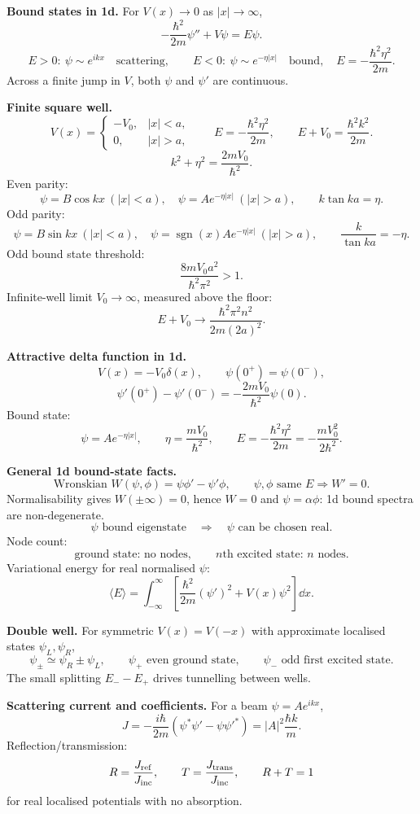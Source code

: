\noindent\textbf{Bound states in 1d.}
For \(V(x)\to0\) as \(|x|\to\infty\),
\[
-\frac{\hbar^2}{2m}\psi''+V\psi=E\psi.
\]
\[
E>0:\ \psi\sim e^{ikx}\quad\text{scattering},\qquad
E<0:\ \psi\sim e^{-\eta |x|}\quad\text{bound},\quad
E=-\frac{\hbar^2\eta^2}{2m}.
\]
Across a finite jump in \(V\), both \(\psi\) and \(\psi'\) are continuous.

\noindent\textbf{Finite square well.}
\[
V(x)=\begin{cases}-V_0,&|x|<a,\\0,&|x|>a,\end{cases}\qquad
E=-\frac{\hbar^2\eta^2}{2m},\qquad
E+V_0=\frac{\hbar^2k^2}{2m}.
\]
\[
k^2+\eta^2=\frac{2mV_0}{\hbar^2}.
\]
Even parity:
\[
\psi=B\cos kx\ (|x|<a),\quad \psi=Ae^{-\eta |x|}\ (|x|>a),\qquad
k\tan ka=\eta .
\]
Odd parity:
\[
\psi=B\sin kx\ (|x|<a),\quad
\psi=\operatorname{sgn}(x)Ae^{-\eta |x|}\ (|x|>a),\qquad
\frac{k}{\tan ka}=-\eta .
\]
Odd bound state threshold:
\[
\frac{8mV_0a^2}{\hbar^2\pi^2}>1.
\]
Infinite-well limit \(V_0\to\infty\), measured above the floor:
\[
E+V_0\to\frac{\hbar^2\pi^2n^2}{2m(2a)^2}.
\]

\noindent\textbf{Attractive delta function in 1d.}
\[
V(x)=-V_0\delta(x),\qquad \psi(0^+)=\psi(0^-),
\]
\[
\boxed{\psi'(0^+)-\psi'(0^-)=-\frac{2mV_0}{\hbar^2}\psi(0)}.
\]
Bound state:
\[
\psi=Ae^{-\eta |x|},\qquad
\eta=\frac{mV_0}{\hbar^2},\qquad
\boxed{E=-\frac{\hbar^2\eta^2}{2m}=-\frac{mV_0^2}{2\hbar^2}}.
\]

\noindent\textbf{General 1d bound-state facts.}
\[
\text{Wronskian }W(\psi,\phi)=\psi\phi'-\psi'\phi,\qquad
\psi,\phi\text{ same }E\Longrightarrow W'=0.
\]
Normalisability gives \(W(\pm\infty)=0\), hence \(W=0\) and
\(\psi=\alpha\phi\): 1d bound spectra are non-degenerate.
\[
\psi\text{ bound eigenstate}\quad\Longrightarrow\quad
\psi\text{ can be chosen real}.
\]
Node count:
\[
\text{ground state: no nodes},\qquad
n\text{th excited state: }n\text{ nodes}.
\]
Variational energy for real normalised \(\psi\):
\[
\langle E\rangle=\int_{-\infty}^{\infty}
\left[\frac{\hbar^2}{2m}(\psi')^2+V(x)\psi^2\right]\dd x .
\]

\noindent\textbf{Double well.}
For symmetric \(V(x)=V(-x)\) with approximate localised states
\(\psi_L,\psi_R\),
\[
\psi_\pm\simeq\psi_R\pm\psi_L,\qquad
\psi_+\text{ even ground state},\qquad
\psi_-\text{ odd first excited state}.
\]
The small splitting \(E_- - E_+\) drives tunnelling between wells.

\noindent\textbf{Scattering current and coefficients.}
For a beam \(\psi=Ae^{ikx}\),
\[
J=-\frac{i\hbar}{2m}(\psi^*\psi'-\psi\psi'^*)
=|A|^2\frac{\hbar k}{m}.
\]
Reflection/transmission:
\[
R=\frac{J_{\rm ref}}{J_{\rm inc}},\qquad
T=\frac{J_{\rm trans}}{J_{\rm inc}},\qquad R+T=1
\]
for real localised potentials with no absorption.

